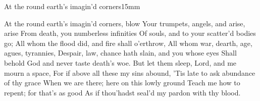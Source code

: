 \begin{poem}{At the round earth's imagin'd corners}{15mm}
  \begin{stanza}
    At the round earth's imagin'd corners, blow
Your trumpets, angels, and arise, arise
From death, you numberless infinities
Of souls, and to your scatter'd bodies go;
All whom the flood did, and fire shall o'erthrow,
All whom war, dearth, age, agues, tyrannies,
Despair, law, chance hath slain, and you whose eyes
Shall behold God and never taste death's woe.
But let them sleep, Lord, and me mourn a space,
For if above all these my sins abound,
'Tis late to ask abundance of thy grace
When we are there; here on this lowly ground
Teach me how to repent; for that's as good
As if thou'hadst seal'd my pardon with thy blood.
\end{stanza}
\end{poem}
